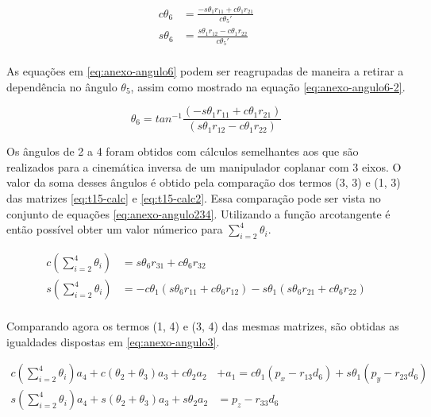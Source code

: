 \begin{align}
    \label{eq:anexo-angulo6}
    c\theta_6 &= \frac{-s\theta_1r_{11} + c\theta_1r_{21}}{c\theta_5'} \nonumber\\
    s\theta_6 &= \frac{s\theta_1r_{12} - c\theta_1r_{22}}{c\theta_5'} \nonumber\\
\end{align}

As equações em \ref{eq:anexo-angulo6} podem ser reagrupadas de maneira a retirar a dependência no 
ângulo $\theta_5$, assim como mostrado na equação \ref{eq:anexo-angulo6-2}.

\begin{equation}
    \label{eq:anexo-angulo6-2}
    \theta_6 = tan^{-1}\frac{(-s\theta_1r_{11} + c\theta_1r_{21})}{(s\theta_1r_{12} - c\theta_1r_{22})}
\end{equation}

Os ângulos de 2 a 4 foram obtidos com cálculos semelhantes aos que são realizados para a cinemática 
inversa de um manipulador coplanar com 3 eixos. O valor da soma desses ângulos é obtido pela 
comparação dos termos (3, 3) e (1, 3) das matrizes \ref{eq:t15-calc} e \ref{eq:t15-calc2}. 
Essa comparação pode ser vista no conjunto de equações \ref{eq:anexo-angulo234}. Utilizando
a função arcotangente é então possível obter um valor númerico para $\sum\limits_{i=2}^4\theta_i$.

\begin{align}
    \label{eq:anexo-angulo234}
    c(\sum\limits_{i=2}^4\theta_i) &= s\theta_6r_{31} + c\theta_6r_{32} \nonumber\\
    s(\sum\limits_{i=2}^4\theta_i) &= -c\theta_1(s\theta_6r_{11}+c\theta_6r_{12}) - s\theta_1(s\theta_6r_{21}+c\theta_6r_{22}) \nonumber\\
\end{align}

Comparando agora os termos (1, 4) e (3, 4) das mesmas matrizes, são obtidas as igualdades dispostas em 
\ref{eq:anexo-angulo3}.

\begin{align}
    \label{eq:anexo-angulo3}
    c(\sum\limits_{i=2}^4\theta_i)a_4 + c(\theta_2+\theta_3)a_3 + c\theta_2a_2& + a_1 = c\theta_1(p_x-r_{13}d_6) + s\theta_1(p_y-r_{23}d_6) \nonumber\\
    s(\sum\limits_{i=2}^4\theta_i)a_4 + s(\theta_2+\theta_3)a_3 + s\theta_2a_2&       = p_z - r_{33}d_6 \nonumber\\
\end{align}

